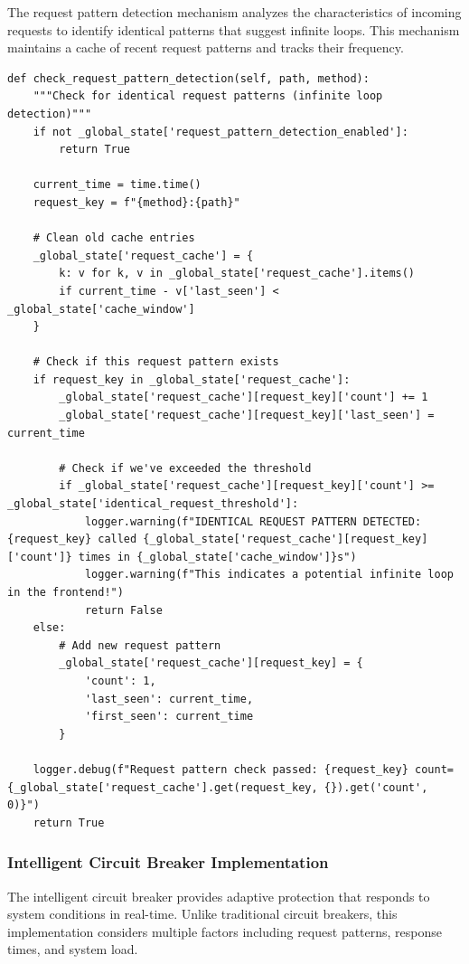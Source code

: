 \documentclass[10pt]{article}
\begin{document}
The request pattern detection mechanism analyzes the characteristics of incoming requests to identify identical patterns that suggest infinite loops. This mechanism maintains a cache of recent request patterns and tracks their frequency.

\begin{lstlisting}[caption={Request Pattern Detection Implementation}]
def check_request_pattern_detection(self, path, method):
    """Check for identical request patterns (infinite loop detection)"""
    if not _global_state['request_pattern_detection_enabled']:
        return True
        
    current_time = time.time()
    request_key = f"{method}:{path}"
    
    # Clean old cache entries
    _global_state['request_cache'] = {
        k: v for k, v in _global_state['request_cache'].items() 
        if current_time - v['last_seen'] < _global_state['cache_window']
    }
    
    # Check if this request pattern exists
    if request_key in _global_state['request_cache']:
        _global_state['request_cache'][request_key]['count'] += 1
        _global_state['request_cache'][request_key]['last_seen'] = current_time
        
        # Check if we've exceeded the threshold
        if _global_state['request_cache'][request_key]['count'] >= _global_state['identical_request_threshold']:
            logger.warning(f"IDENTICAL REQUEST PATTERN DETECTED: {request_key} called {_global_state['request_cache'][request_key]['count']} times in {_global_state['cache_window']}s")
            logger.warning(f"This indicates a potential infinite loop in the frontend!")
            return False
    else:
        # Add new request pattern
        _global_state['request_cache'][request_key] = {
            'count': 1,
            'last_seen': current_time,
            'first_seen': current_time
        }
    
    logger.debug(f"Request pattern check passed: {request_key} count={_global_state['request_cache'].get(request_key, {}).get('count', 0)}")
    return True
\end{lstlisting}

\subsubsection{Intelligent Circuit Breaker Implementation}

The intelligent circuit breaker provides adaptive protection that responds to system conditions in real-time. Unlike traditional circuit breakers, this implementation considers multiple factors including request patterns, response times, and system load.
\end{document}

